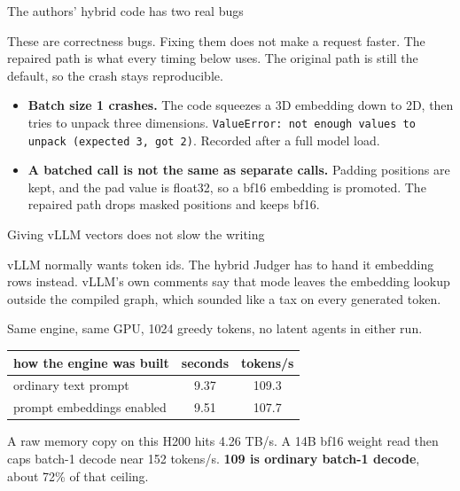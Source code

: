 \documentclass[aspectratio=169]{beamer}
\begin{document}
\begin{frame}{The authors' hybrid code has two real bugs}

These are correctness bugs. Fixing them does not make a request faster.
The repaired path is what every timing below uses. The original path is
still the default, so the crash stays reproducible.

\vspace{0.4em}
\begin{itemize}
  \item \textbf{Batch size 1 crashes.} The code squeezes a 3D embedding down
        to 2D, then tries to unpack three dimensions.
        \texttt{ValueError: not enough values to unpack (expected 3, got 2)}.
        Recorded after a full model load.
  \item \textbf{A batched call is not the same as separate calls.} Padding
        positions are kept, and the pad value is float32, so a bf16 embedding
        is promoted. The repaired path drops masked positions and keeps bf16.
\end{itemize}

\end{frame}

\begin{frame}{Giving vLLM vectors does not slow the writing}

vLLM normally wants token ids. The hybrid Judger has to hand it embedding
rows instead. vLLM's own comments say that mode leaves the embedding lookup
outside the compiled graph, which sounded like a tax on every generated token.

\vspace{0.4em}
Same engine, same GPU, 1024 greedy tokens, no latent agents in either run.

\begin{center}
\begin{tabular}{lcc}
\toprule
how the engine was built & seconds & tokens/s \\
\midrule
ordinary text prompt & 9.37 & 109.3 \\
prompt embeddings enabled & 9.51 & 107.7 \\
\bottomrule
\end{tabular}
\end{center}

\vspace{0.4em}
A raw memory copy on this H200 hits 4.26 TB/s. A 14B bf16 weight read then
caps batch-1 decode near 152 tokens/s. \textbf{109 is ordinary batch-1
decode}, about 72\% of that ceiling.

\end{frame}
\end{document}
